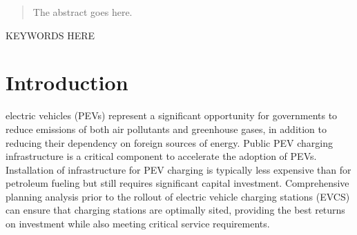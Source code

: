 \documentclass[journal]{IEEEtran}
\begin{document}







\maketitle

\begin{abstract}
The abstract goes here.
\end{abstract}

\begin{IEEEkeywords}
KEYWORDS HERE
\end{IEEEkeywords}






%
\IEEEpeerreviewmaketitle



\section{Introduction}
% 
% 
% 
% 
 electric vehicles (PEVs) represent a significant opportunity for governments to reduce emissions of both air pollutants and greenhouse gases, in addition to reducing their dependency on foreign sources of energy. Public PEV charging infrastructure is a critical component to accelerate the adoption of PEVs. Installation of infrastructure for PEV charging is typically less expensive than for petroleum fueling but still requires significant capital investment. Comprehensive planning analysis prior to the rollout of electric vehicle charging stations (EVCS) can ensure that charging stations are optimally sited, providing the best returns on investment while also meeting critical service requirements.
\end{document}
